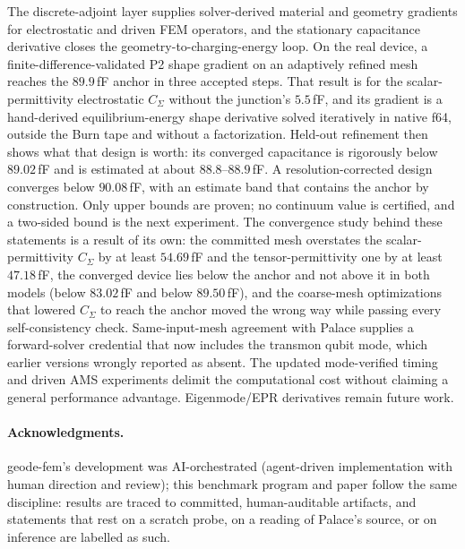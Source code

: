 \documentclass{anvil-paper}
\begin{document}
The discrete-adjoint layer supplies solver-derived material and
geometry gradients for electrostatic and driven FEM operators, and the
stationary capacitance derivative closes the geometry-to-charging-energy
loop. On the real device, a finite-difference-validated P2 shape
gradient on an adaptively refined mesh reaches the $89.9$\,fF anchor in
three accepted steps. That result is for the scalar-permittivity
electrostatic $C_\Sigma$ without the junction's $5.5$\,fF, and its
gradient is a hand-derived equilibrium-energy shape derivative solved
iteratively in native f64, outside the Burn tape and without a
factorization. Held-out refinement then shows what that design
is worth: its converged capacitance is rigorously below $89.02$\,fF and
is estimated at about $88.8$--$88.9$\,fF. A resolution-corrected design
converges below $90.08$\,fF, with an estimate band that contains the
anchor by construction. Only upper bounds are proven; no continuum
value is certified, and a two-sided bound is the next experiment. The
convergence study behind these statements is a result of its own: the
committed mesh overstates the scalar-permittivity $C_\Sigma$ by at
least $54.69$\,fF and the tensor-permittivity one by at least
$47.18$\,fF, the converged device lies below the anchor and not above
it in both models (below $83.02$\,fF and below $89.50$\,fF), and the
coarse-mesh optimizations that lowered $C_\Sigma$ to reach the anchor
moved the wrong way while passing every self-consistency check.
Same-input-mesh agreement with Palace supplies a forward-solver
credential that now includes the transmon qubit mode, which earlier
versions wrongly reported as absent. The updated mode-verified timing
and driven AMS experiments delimit the computational cost without
claiming a general performance advantage. Eigenmode/EPR
derivatives remain future work.

\paragraph{Acknowledgments.}
geode-fem's development was AI-orchestrated (agent-driven implementation
with human direction and review); this benchmark program and paper
follow the same discipline: results are traced to committed,
human-auditable artifacts, and statements that rest on a scratch probe,
on a reading of Palace's source, or on inference are labelled as such.
\end{document}

